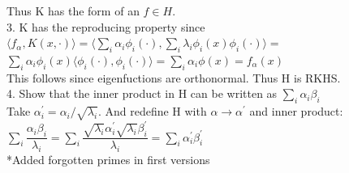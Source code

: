 \documentclass[18pt]{article}
\begin{document}
\begin{flushleft}
\vspace{.4cm}
Thus K has the form of an $f \in H$.\\
\vspace{.4cm}
3. K has the reproducing property since\\
\vspace{.4cm}
$\langle f_\alpha, K(x,\cdot)\rangle=\langle \sum\limits_i \alpha_i \phi_i(\cdot),\sum\limits_i \lambda_i \phi_i(x)\phi_i(\cdot)\rangle=$\\
$\sum\limits_i \alpha_i \phi_i(x) \langle \phi_i(\cdot),\phi_i(\cdot) \rangle=\sum\limits_i \alpha_i \phi(x)=f_\alpha(x)$\\
\vspace{.4cm}
This follows since eigenfuctions are orthonormal. Thus H is RKHS.\\
\vspace{.4cm}
4. Show that the inner product in H can be written as $\sum_i \alpha_i \beta_i$\\
\vspace{.4cm}
Take $\alpha^{\prime}_i=\alpha_i/\sqrt{\lambda_i}$. And redefine H with $\alpha\rightarrow \alpha^{\prime}$ and inner product:\\
\vspace{.4cm}
$\sum\limits_i \dfrac{\alpha_i \beta_i}{\lambda_i}=\sum\limits_i\dfrac{ \sqrt{\lambda_i} \alpha_i^{\prime} \sqrt{\lambda_i} \beta_i^{\prime}}{\lambda_i}=\sum_i \alpha_i^{\prime} \beta_i^{\prime}$\\
\vspace{.4cm}
*Added forgotten primes in first versions





















\end{flushleft}
\end{document}
